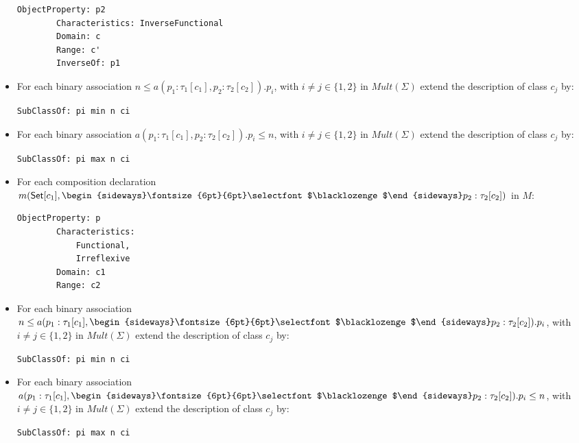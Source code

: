 \documentclass[10pt, a4paper]{isov2}
\newcommand{\composition}{\raisebox{0.2pt}{\begin{sideways}\fontsize{6pt}{6pt}\selectfont$\blacklozenge$\end{sideways}}}
\begin{document}
\begin{itemize}
\begin{lstlisting}[language=owl2Manchester]
	ObjectProperty: p2
		Characteristics: InverseFunctional
		Domain: c
		Range: c'
		InverseOf: p1
\end{lstlisting}
\item For each binary association $n \leq a(p_1:\tau_1[c_1],p_2:\tau_2[c_2]).p_i$, with $i \neq j\in\{1,2\}$ in $\mathit{Mult}(\Sigma)$ extend the description of class $c_j$ by:
\begin{lstlisting}[language=owl2Manchester]
	SubClassOf: pi min n ci
\end{lstlisting}
\item For each binary association $a(p_1:\tau_1[c_1],p_2:\tau_2[c_2]).p_i \leq n$, with $i \neq j\in\{1,2\}$  in $\mathit{Mult}(\Sigma)$ extend the description of class $c_j$ by:
\begin{lstlisting}[language=owl2Manchester]
	SubClassOf: pi max n ci
\end{lstlisting}
\item For each composition declaration $m(\mathsf{Set}[c_1], \composition p_2 :
\tau_2[c_2])$ in $M$:
\begin{lstlisting}[language=owl2Manchester]
	ObjectProperty: p
		Characteristics:
			Functional, 
			Irreflexive
		Domain: c1
		Range: c2
\end{lstlisting}
\item For each binary association $n \leq a(p_1:\tau_1[c_1], \composition p_2:\tau_2[c_2]).p_i$, with $i \neq j\in\{1,2\}$  in $\mathit{Mult}(\Sigma)$  extend the description of class $c_j$ by:
\begin{lstlisting}[language=owl2Manchester]
	SubClassOf: pi min n ci
\end{lstlisting}
\item For each binary association $a(p_1:\tau_1[c_1], \composition p_2:\tau_2[c_2]).p_i \leq n$, with $i \neq j\in\{1,2\}$  in $\mathit{Mult}(\Sigma)$ extend the description of class $c_j$ by:
\begin{lstlisting}[language=owl2Manchester]
	SubClassOf: pi max n ci
\end{lstlisting}
 \end{itemize} 

\end{document}
